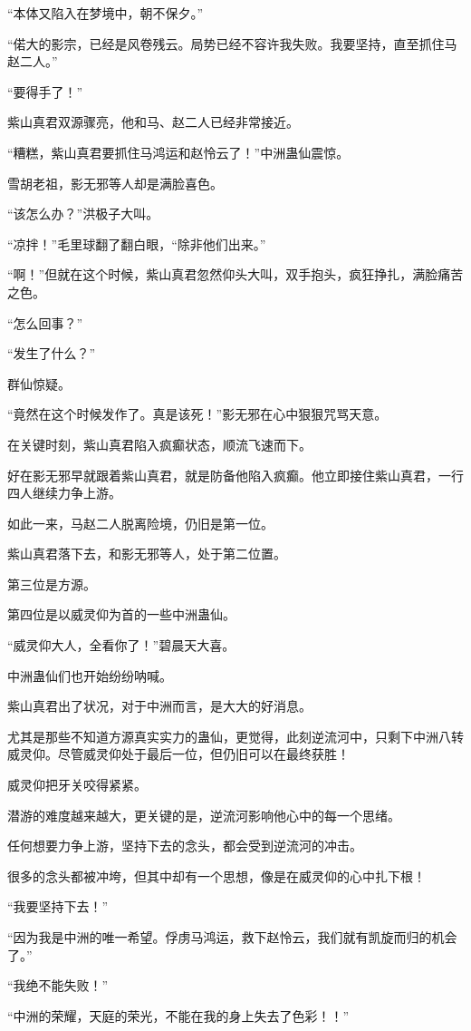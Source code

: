\begin{this_body}
“本体又陷入在梦境中，朝不保夕。”

“偌大的影宗，已经是风卷残云。局势已经不容许我失败。我要坚持，直至抓住马赵二人。”

“要得手了！”

紫山真君双源骤亮，他和马、赵二人已经非常接近。

“糟糕，紫山真君要抓住马鸿运和赵怜云了！”中洲蛊仙震惊。

雪胡老祖，影无邪等人却是满脸喜色。

“该怎么办？”洪极子大叫。

“凉拌！”毛里球翻了翻白眼，“除非他们出来。”

“啊！”但就在这个时候，紫山真君忽然仰头大叫，双手抱头，疯狂挣扎，满脸痛苦之色。

“怎么回事？”

“发生了什么？”

群仙惊疑。

“竟然在这个时候发作了。真是该死！”影无邪在心中狠狠咒骂天意。

在关键时刻，紫山真君陷入疯癫状态，顺流飞速而下。

好在影无邪早就跟着紫山真君，就是防备他陷入疯癫。他立即接住紫山真君，一行四人继续力争上游。

如此一来，马赵二人脱离险境，仍旧是第一位。

紫山真君落下去，和影无邪等人，处于第二位置。

第三位是方源。

第四位是以威灵仰为首的一些中洲蛊仙。

“威灵仰大人，全看你了！”碧晨天大喜。

中洲蛊仙们也开始纷纷呐喊。

紫山真君出了状况，对于中洲而言，是大大的好消息。

尤其是那些不知道方源真实实力的蛊仙，更觉得，此刻逆流河中，只剩下中洲八转威灵仰。尽管威灵仰处于最后一位，但仍旧可以在最终获胜！

威灵仰把牙关咬得紧紧。

潜游的难度越来越大，更关键的是，逆流河影响他心中的每一个思绪。

任何想要力争上游，坚持下去的念头，都会受到逆流河的冲击。

很多的念头都被冲垮，但其中却有一个思想，像是在威灵仰的心中扎下根！

“我要坚持下去！”

“因为我是中洲的唯一希望。俘虏马鸿运，救下赵怜云，我们就有凯旋而归的机会了。”

“我绝不能失败！”

“中洲的荣耀，天庭的荣光，不能在我的身上失去了色彩！！”


\end{this_body}
